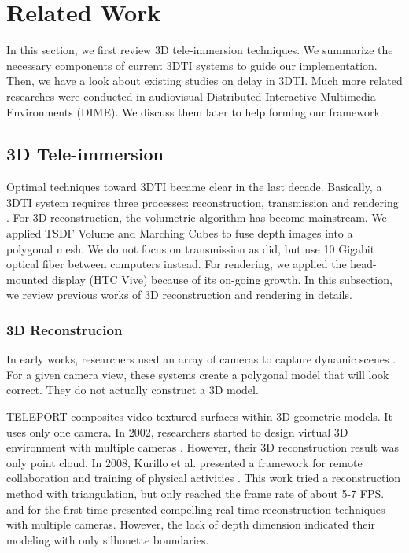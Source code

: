 \section{Related Work}

In this section, we first review 3D tele-immersion techniques. We summarize the necessary components of current 3DTI systems to guide our implementation. Then, we have a look about existing studies on delay in 3DTI. Much more related researches were conducted in audiovisual Distributed Interactive Multimedia Environments (DIME). We discuss them later to help forming our framework.

\subsection{3D Tele-immersion}

Optimal techniques toward 3DTI became clear in the last decade. Basically, a 3DTI system requires three processes: reconstruction, transmission and rendering \cite{fuchs2014immersive}. For 3D reconstruction, the volumetric algorithm has become mainstream. We applied TSDF Volume \cite{curless1996volumetric} and Marching Cubes \cite{lorensen1987marching} to fuse depth images into a polygonal mesh. We do not focus on transmission as \cite{beck2013immersive, pece2011adapting} did, but use 10 Gigabit optical fiber between computers instead. For rendering, we applied the head-mounted display (HTC Vive) because of its on-going growth. In this subsection, we review previous works of 3D reconstruction and rendering in details.

\subsubsection{3D Reconstrucion}

In early works, researchers used an array of cameras to capture dynamic scenes \cite{kanade1997virtualized, fuchs1994virtual}. For a given camera view, these systems create a polygonal model that will look correct. They do not actually construct a 3D model.

TELEPORT \cite{gibbs1999teleport} composites video-textured surfaces within 3D geometric models. It uses only one camera. In 2002, researchers started to design virtual 3D environment with multiple cameras \cite{gross2003blue, towles20023d}. However, their 3D reconstruction result was only point cloud. In 2008, Kurillo et al. presented a framework for remote collaboration and training of physical activities \cite{kurillo2008immersive}. This work tried a reconstruction method with triangulation, but only reached the frame rate of about 5-7 FPS. \cite{loop2013real} and \cite{petit2010multicamera} for the first time presented compelling real-time reconstruction techniques with multiple cameras. However, the lack of depth dimension indicated their modeling with only silhouette boundaries.

